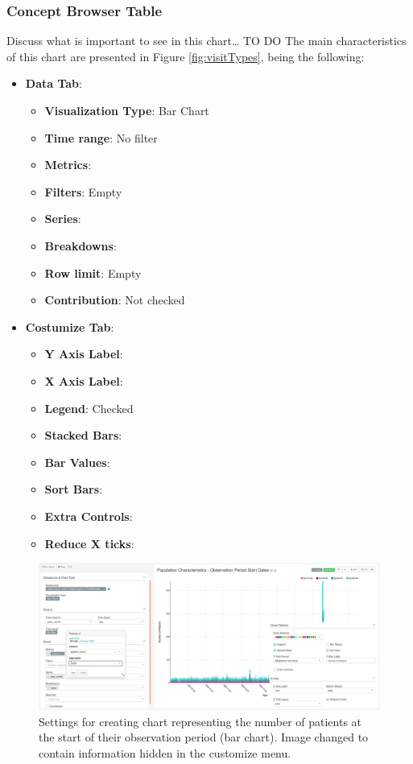 \documentclass[]{book}
\providecommand{\tightlist}{%
  \setlength{\itemsep}{0pt}\setlength{\parskip}{0pt}}
\begin{document}
\subsubsection{Concept Browser Table}\label{concept-browser-table}

Discuss what is important to see in this chart\ldots{} TO DO The main
characteristics of this chart are presented in Figure
\ref{fig:visitTypes}, being the following:

\begin{itemize}
\tightlist
\item
  \textbf{Data Tab}:

  \begin{itemize}
  \tightlist
  \item
    \textbf{Visualization Type}: Bar Chart
  \item
    \textbf{Time range}: No filter
  \item
    \textbf{Metrics}:
  \item
    \textbf{Filters}: Empty
  \item
    \textbf{Series}:
  \item
    \textbf{Breakdowns}:
  \item
    \textbf{Row limit}: Empty
  \item
    \textbf{Contribution}: Not checked
  \end{itemize}
\item
  \textbf{Costumize Tab}:

  \begin{itemize}
  \tightlist
  \item
    \textbf{Y Axis Label}:
  \item
    \textbf{X Axis Label}:
  \item
    \textbf{Legend}: Checked
  \item
    \textbf{Stacked Bars}:
  \item
    \textbf{Bar Values}:
  \item
    \textbf{Sort Bars}:
  \item
    \textbf{Extra Controls}:
  \item
    \textbf{Reduce X ticks}:
  \end{itemize}
\end{itemize}

\begin{figure}
\includegraphics[width=1\linewidth]{images/populationCharacteristicsObservationPeriodStartDates} \caption{Settings for creating chart representing the number of patients at the start of their observation period (bar chart). Image changed to contain information hidden in the customize menu.}\label{fig:visitTypes3}
\end{figure}
\end{document}
